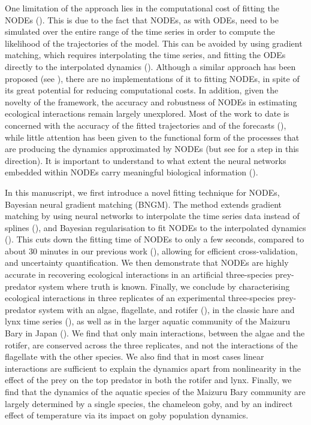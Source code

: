 \documentclass[11pt, oneside]{article}
\begin{document}
One limitation of the approach lies in the computational cost of fitting the NODEs (\cite{Chen2018,Bonnaffe2021a}).
This is due to the fact that NODEs, as with ODEs, need to be simulated over the entire range of the time series in order to compute the likelihood of the trajectories of the model.
This can be avoided by using gradient matching, which requires interpolating the time series, and fitting the ODEs directly to the interpolated dynamics (\cite{Jost2000,Aarts2001,Ellner2002}).
Although a similar approach has been proposed (see \cite{Treven2021}), there are no implementations of it to fitting NODEs, in spite of its great potential for reducing computational costs.
In addition, given the novelty of the framework, the accuracy and robustness of NODEs in estimating ecological interactions remain largely unexplored.
Most of the work to date is concerned with the accuracy of the fitted trajectories and of the forecasts (\cite{Mai2016,Treven2021,Frank2022}), while little attention has been given to the functional form of the processes that are producing the dynamics approximated by NODEs (but see \cite{Hu2020} for a step in this direction).
It is important to understand to what extent the neural networks embedded within NODEs carry meaningful biological information (\cite{Novak2021}).

In this manuscript, we first introduce a novel fitting technique for NODEs, Bayesian neural gradient matching (BNGM). 
The method extends gradient matching by using neural networks to interpolate the time series data instead of splines (\cite{Ellner2002}), and Bayesian regularisation to fit NODEs to the interpolated dynamics (\cite{Cawley2007}). 
This cuts down the fitting time of NODEs to only a few seconds, compared to about 30 minutes in our previous work (\cite{Bonnaffe2021a}), allowing for efficient cross-validation, and uncertainty quantification.
We then demonstrate that NODEs are highly accurate in recovering ecological interactions in an artificial three-species prey-predator system where truth is known.
Finally, we conclude by characterising ecological interactions in three replicates of an experimental three-species prey-predator system with an algae, flagellate, and rotifer (\cite{Hiltunen2013}), in the classic hare and lynx time series (\cite{Odum1972}), as well as in the larger aquatic community of the Maizuru Bary in Japan (\cite{Ushio2018}).
We find that only main interactions, between the algae and the rotifer, are conserved across the three replicates, and not the interactions of the flagellate with the other species.
We also find that in most cases linear interactions are sufficient to explain the dynamics apart from nonlinearity in the effect of the prey on the top predator in both the rotifer and lynx.
Finally, we find that the dynamics of the aquatic species of the Maizuru Bary community are largely determined by a single species, the chameleon goby, and by an indirect effect of temperature via its impact on goby population dynamics.
\end{document}
